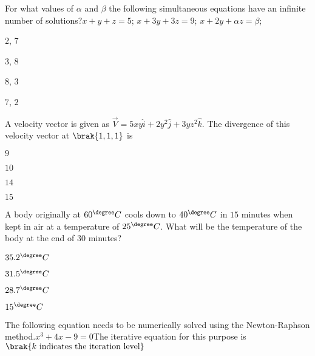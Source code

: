 \item For what values of $\alpha$ and $\beta$ the following simultaneous equations have an infinite number of solutions?\newline $x+y+z=5$; $x+3y+3z=9$; $x+2y+\alpha z=\beta$;

\hfill{}
\begin{enumerate}
\begin{multicols}{4}
\item $2$, $7$
\item $3$, $8$
\item $8$, $3$
\item $7$, $2$
\end{multicols}
\end{enumerate}

\item A velocity vector is given as $\vec{V}=5xy\hat{i}+2y^2\hat{j}+3yz^2\hat{k}$. The divergence of this velocity vector at $\brak{1,1,1}$ is

\hfill{}
\begin{enumerate}
\begin{multicols}{4}
\item $9$
\item $10$
\item $14$
\item $15$
\end{multicols}
\end{enumerate}

\item A body originally at $60^{\degree} C$ cools down to $40^{\degree} C$ in $15$ minutes when kept in air at a temperature of $25^{\degree} C$. What will be the temperature of the body at the end of $30$ minutes?

\hfill{}
\begin{enumerate}
\begin{multicols}{4}
\item $35.2^{\degree} C$
\item $31.5^{\degree} C$
\item $28.7^{\degree} C$
\item $15^{\degree} C$
\end{multicols}
\end{enumerate}

\item The following equation needs to be numerically solved using the Newton-Raphson method.\newline $x^3+4x-9=0$\newline The iterative equation for this purpose is $\brak{k\text{ indicates the iteration level}}$ 

